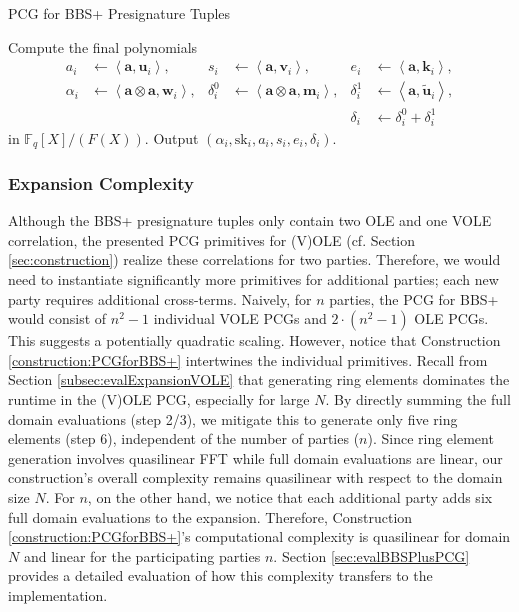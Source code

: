 \begin{specialconstruction}{PCG for BBS+ Presignature Tuples}
\begin{algorithmic}[1]
\State Compute the final polynomials
\begin{align*}
a_{i} & \leftarrow \left\langle\boldsymbol{a}, \boldsymbol{u}_{i}\right\rangle, & 
s_{i} & \leftarrow \left\langle\boldsymbol{a}, \boldsymbol{v}_{i}\right\rangle, &
e_{i} & \leftarrow \left\langle\boldsymbol{a}, \boldsymbol{k}_{i}\right\rangle, \\
\alpha_{i} & \leftarrow \left\langle\boldsymbol{a} \otimes \boldsymbol{a},  \boldsymbol{w}_{i}\right\rangle, & 
\delta_{i}^{0} & \leftarrow \left\langle\boldsymbol{a} \otimes \boldsymbol{a},  \boldsymbol{m}_{i}\right\rangle, & 
\delta_{i}^{1} & \leftarrow \left\langle\boldsymbol{a},  \widetilde{\boldsymbol{u}}_{i}\right\rangle, \\
& & & & \delta_{i} & \leftarrow \delta_{i}^{0} + \delta_{i}^{1}
\end{align*}
in $\mathbb{F}_{q}[X] / (F(X))$. Output $\left(\alpha_{i}, \mathrm{sk}_{i}, a_{i}, s_{i}, e_{i}, \delta_{i}\right)$.
\end{algorithmic}
\end{specialconstruction}



\subsubsection{Expansion Complexity}
Although the BBS+ presignature tuples only contain two OLE and one VOLE correlation, the presented PCG primitives for (V)OLE (cf. Section \ref{sec:construction}) realize these correlations for two parties. Therefore, we would need to instantiate significantly more primitives for additional parties; each new party requires additional cross-terms. Naively, for $n$ parties, the PCG for BBS+ would consist of $n^2-1$ individual VOLE PCGs and $2\cdot(n^2-1)$ OLE PCGs. This suggests a potentially quadratic scaling. However, notice that Construction \ref{construction:PCGforBBS+} intertwines the individual primitives. Recall from Section \ref{subsec:evalExpansionVOLE} that generating ring elements dominates the runtime in the (V)OLE PCG, especially for large $N$. By directly summing the full domain evaluations (step 2/3), we mitigate this to generate only five ring elements (step 6), independent of the number of parties ($n$). Since ring element generation involves quasilinear FFT while full domain evaluations are linear, our construction's overall complexity remains quasilinear with respect to the domain size $N$. For $n$, on the other hand, we notice that each additional party adds six full domain evaluations to the expansion. Therefore, Construction \ref{construction:PCGforBBS+}'s computational complexity is quasilinear for domain $N$ and linear for the participating parties $n$. Section \ref{sec:evalBBSPlusPCG} provides a detailed evaluation of how this complexity transfers to the implementation.

